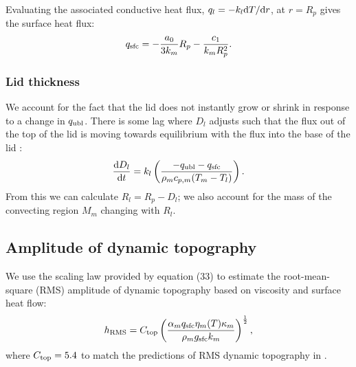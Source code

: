 Evaluating the associated conductive heat flux, $q_{l} = -k_l \mathrm{d} T/\mathrm{d} r$, at $r = R_p$ gives the surface heat flux:
\begin{equation}
q_{\rm sfc} = -\frac{a_0}{3k_m}R_p - \frac{c_1}{k_m R_p^2}.
\end{equation}



\subsubsection{Lid thickness}

%


We account for the fact that the lid does not instantly grow or shrink in response to a change in $q_{\rm ubl}$. There is some lag where $D_l$ adjusts such that the flux out of the top of the lid is moving towards equilibrium with the flux into the base of the lid \citep{Thiriet2019}:
\begin{equation}\label{eq:D_l}
\frac{\mathrm{d} D_l}{\mathrm{d} t} = k_l \left(\frac{-q_{\rm ubl} - q_{\rm sfc}}{\rho_m c_{p,m} (T_m - T_l)} \right). 
\end{equation}
From this we can calculate $R_l = R_p - D_l$; we also account for the mass of the convecting region $M_m$ changing with $R_l$.




\subsection{Amplitude of dynamic topography}

We use the scaling law provided by \citet{Parsons1983} equation (33) to estimate the root-mean-square (RMS) amplitude of dynamic topography based on viscosity and surface heat flow:
\begin{equation}\label{eq:RMS}
h_{\rm RMS} = C_{\rm top} \left(\frac{\alpha_m q_{\rm sfc} \eta_m(T) \kappa_m}{\rho_m g_{\rm sfc} k_m}\right)^\frac{1}{2},
\end{equation}
where $C_{\rm top} = 5.4$ to match the predictions of RMS dynamic topography in \citet{Lees2019}.


